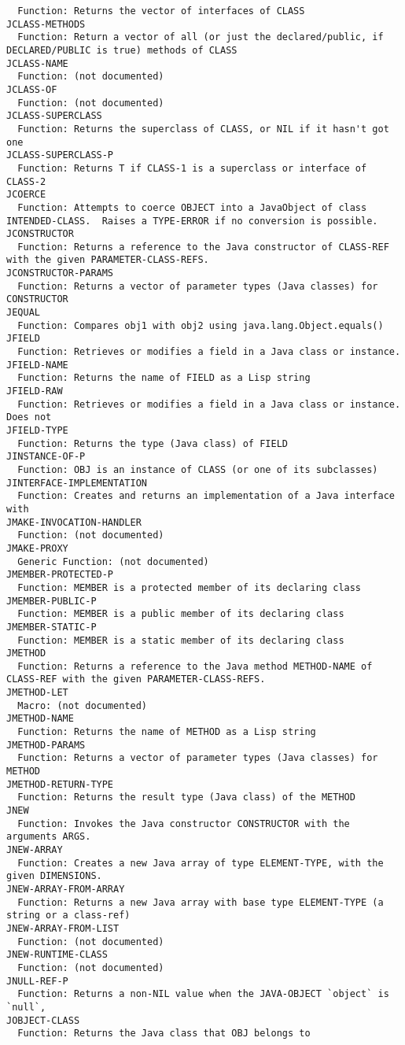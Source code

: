 \begin{verbatim}
  Function: Returns the vector of interfaces of CLASS
JCLASS-METHODS
  Function: Return a vector of all (or just the declared/public, if DECLARED/PUBLIC is true) methods of CLASS
JCLASS-NAME
  Function: (not documented)
JCLASS-OF
  Function: (not documented)
JCLASS-SUPERCLASS
  Function: Returns the superclass of CLASS, or NIL if it hasn't got one
JCLASS-SUPERCLASS-P
  Function: Returns T if CLASS-1 is a superclass or interface of CLASS-2
JCOERCE
  Function: Attempts to coerce OBJECT into a JavaObject of class INTENDED-CLASS.  Raises a TYPE-ERROR if no conversion is possible.
JCONSTRUCTOR
  Function: Returns a reference to the Java constructor of CLASS-REF with the given PARAMETER-CLASS-REFS.
JCONSTRUCTOR-PARAMS
  Function: Returns a vector of parameter types (Java classes) for CONSTRUCTOR
JEQUAL
  Function: Compares obj1 with obj2 using java.lang.Object.equals()
JFIELD
  Function: Retrieves or modifies a field in a Java class or instance.
JFIELD-NAME
  Function: Returns the name of FIELD as a Lisp string
JFIELD-RAW
  Function: Retrieves or modifies a field in a Java class or instance. Does not
JFIELD-TYPE
  Function: Returns the type (Java class) of FIELD
JINSTANCE-OF-P
  Function: OBJ is an instance of CLASS (or one of its subclasses)
JINTERFACE-IMPLEMENTATION
  Function: Creates and returns an implementation of a Java interface with
JMAKE-INVOCATION-HANDLER
  Function: (not documented)
JMAKE-PROXY
  Generic Function: (not documented)
JMEMBER-PROTECTED-P
  Function: MEMBER is a protected member of its declaring class
JMEMBER-PUBLIC-P
  Function: MEMBER is a public member of its declaring class
JMEMBER-STATIC-P
  Function: MEMBER is a static member of its declaring class
JMETHOD
  Function: Returns a reference to the Java method METHOD-NAME of CLASS-REF with the given PARAMETER-CLASS-REFS.
JMETHOD-LET
  Macro: (not documented)
JMETHOD-NAME
  Function: Returns the name of METHOD as a Lisp string
JMETHOD-PARAMS
  Function: Returns a vector of parameter types (Java classes) for METHOD
JMETHOD-RETURN-TYPE
  Function: Returns the result type (Java class) of the METHOD
JNEW
  Function: Invokes the Java constructor CONSTRUCTOR with the arguments ARGS.
JNEW-ARRAY
  Function: Creates a new Java array of type ELEMENT-TYPE, with the given DIMENSIONS.
JNEW-ARRAY-FROM-ARRAY
  Function: Returns a new Java array with base type ELEMENT-TYPE (a string or a class-ref)
JNEW-ARRAY-FROM-LIST
  Function: (not documented)
JNEW-RUNTIME-CLASS
  Function: (not documented)
JNULL-REF-P
  Function: Returns a non-NIL value when the JAVA-OBJECT `object` is `null`,
JOBJECT-CLASS
  Function: Returns the Java class that OBJ belongs to

\end{verbatim}

